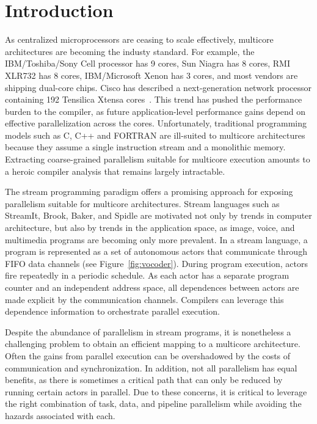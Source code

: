\section{Introduction}


As centralized microprocessors are ceasing to scale effectively,
multicore architectures are becoming the industy standard.  For
example, the IBM/Toshiba/Sony Cell processor has 9 cores\cite{}, Sun
Niagra has 8 cores\cite{}, RMI XLR732 has 8 cores\cite{},
IBM/Microsoft Xenon has 3 cores\cite{}, and most vendors are shipping
dual-core chips.  Cisco has described a next-generation network
processor containing 192 Tensilica Xtensa cores~\cite{etherton05ancs}.
This trend has pushed the performance burden to the compiler, as
future application-level performance gains depend on effective
parallelization across the cores.  Unfortunately, traditional
programming models such as C, C++ and FORTRAN are ill-suited to
multicore architectures because they assume a single instruction
stream and a monolithic memory.  Extracting coarse-grained parallelism
suitable for multicore execution amounts to a heroic compiler analysis
that remains largely intractable.

The stream programming paradigm offers a promising approach for
exposing parallelism suitable for multicore architectures.  Stream
languages such as StreamIt\cite{}, Brook\cite{}, Baker\cite{}, and
Spidle\cite{} are motivated not only by trends in computer
architecture, but also by trends in the application space, as image,
voice, and multimedia programs are becoming only more prevalent.  In a
stream language, a program is represented as a set of autonomous
actors that communicate through FIFO data channels (see
Figure~\ref{fig:vocoder}).  During program execution, actors fire
repeatedly in a periodic schedule.  As each actor has a separate
program counter and an independent address space, all dependences
between actors are made explicit by the communication channels.
Compilers can leverage this dependence information to orchestrate
parallel execution.

Despite the abundance of parallelism in stream programs, it is
nonetheless a challenging problem to obtain an efficient mapping to a
multicore architecture.  Often the gains from parallel execution can
be overshadowed by the costs of communication and synchronization.  In
addition, not all parallelism has equal benefits, as there is
sometimes a critical path that can only be reduced by running certain
actors in parallel.  Due to these concerns, it is critical to leverage
the right combination of task, data, and pipeline parallelism while
avoiding the hazards associated with each.

